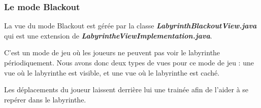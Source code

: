 \subsubsection*{Le mode Blackout}

La vue du mode Blackout est gérée par la classe \textbf{\textit{LabyrinthBlackoutView.java}} qui est une extension de \textbf{\textit{LabyrintheViewImplementation.java}}.

C'est un mode de jeu où les joueurs ne peuvent pas voir le labyrinthe périodiquement. Nous avons donc deux types de vues pour ce mode de jeu : une vue où le labyrinthe est visible, et une vue où le labyrinthe est caché.

Les déplacements du joueur laissent derrière lui une trainée afin de l'aider à se repérer dans le labyrinthe.

\begin{figure}[!htb]%
    \centering
    \qquad

\end{figure}
